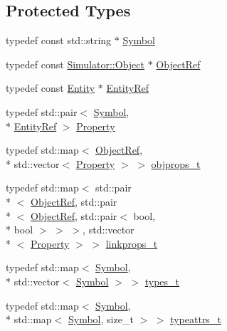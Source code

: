 \subsection*{Protected Types}
\begin{DoxyCompactItemize}
\item 
typedef const std\+::string $\ast$ \hyperlink{class_component_model_registry_a76ae77a9f2c8f03598f7c45e3450cc49}{Symbol}
\item 
typedef const \hyperlink{class_simulator_1_1_object}{Simulator\+::\+Object} $\ast$ \hyperlink{class_component_model_registry_a315c966cec3143524c002daa7301b054}{Object\+Ref}
\item 
typedef const \hyperlink{struct_component_model_registry_1_1_entity}{Entity} $\ast$ \hyperlink{class_component_model_registry_ad5fd4e46e4b78c737db070735c2ffb16}{Entity\+Ref}
\item 
typedef std\+::pair$<$ \hyperlink{class_component_model_registry_a76ae77a9f2c8f03598f7c45e3450cc49}{Symbol}, \\*
\hyperlink{class_component_model_registry_ad5fd4e46e4b78c737db070735c2ffb16}{Entity\+Ref} $>$ \hyperlink{class_component_model_registry_aec59450251d175f19c49a0c020ba3b8f}{Property}
\item 
typedef std\+::map$<$ \hyperlink{class_component_model_registry_a315c966cec3143524c002daa7301b054}{Object\+Ref}, \\*
std\+::vector$<$ \hyperlink{class_component_model_registry_aec59450251d175f19c49a0c020ba3b8f}{Property} $>$ $>$ \hyperlink{class_component_model_registry_af0083198a2d84ecf7d7d668e5b3e4660}{objprops\+\_\+t}
\item 
typedef std\+::map$<$ std\+::pair\\*
$<$ \hyperlink{class_component_model_registry_a315c966cec3143524c002daa7301b054}{Object\+Ref}, std\+::pair\\*
$<$ \hyperlink{class_component_model_registry_a315c966cec3143524c002daa7301b054}{Object\+Ref}, std\+::pair$<$ bool, \\*
bool $>$ $>$ $>$, std\+::vector\\*
$<$ \hyperlink{class_component_model_registry_aec59450251d175f19c49a0c020ba3b8f}{Property} $>$ $>$ \hyperlink{class_component_model_registry_a05e8f9171449fb800c90abee1a698afb}{linkprops\+\_\+t}
\item 
typedef std\+::map$<$ \hyperlink{class_component_model_registry_a76ae77a9f2c8f03598f7c45e3450cc49}{Symbol}, \\*
std\+::vector$<$ \hyperlink{class_component_model_registry_a76ae77a9f2c8f03598f7c45e3450cc49}{Symbol} $>$ $>$ \hyperlink{class_component_model_registry_a8fb4d43b83df65428c1701f659a8acff}{types\+\_\+t}
\item 
typedef std\+::map$<$ \hyperlink{class_component_model_registry_a76ae77a9f2c8f03598f7c45e3450cc49}{Symbol}, \\*
std\+::map$<$ \hyperlink{class_component_model_registry_a76ae77a9f2c8f03598f7c45e3450cc49}{Symbol}, size\+\_\+t $>$ $>$ \hyperlink{class_component_model_registry_a901d7abbb42dbbf185d37d0a342e6564}{typeattrs\+\_\+t}
\end{DoxyCompactItemize}
